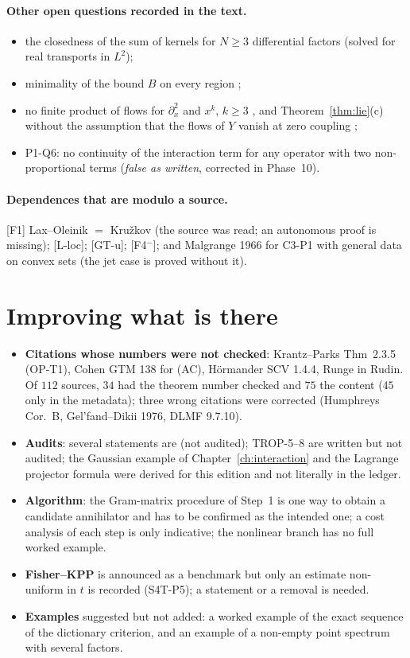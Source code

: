 \paragraph{Other open questions recorded in the text.}
\begin{itemize}
\item the closedness of the sum of kernels for $N\ge3$ differential factors \openq{}  (solved for real transports in $L^2$);
\item minimality of the bound $B$ on every region \openq{} ;
\item no finite product of flows for $\partial_x^2$ and $x^k$, $k\ge3$ \openq{} , and Theorem~\ref{thm:lie}(c) without the assumption that the flows of $Y$ vanish at zero coupling \openq{} ;
\item P1-Q6: no continuity of the interaction term for any operator with two non-proportional terms \openq{} (\emph{false as written}, corrected in Phase~10).
\end{itemize}

\paragraph{Dependences that are modulo a source.} [F1] Lax--Oleinik $=$ Kru\v zkov (the source was read; an autonomous proof is missing); [L-loc]; [GT-u]; [F4$^-$]; and Malgrange 1966 for C3-P1 with general data on convex sets (the jet case is proved without it).

\section{Improving what is there}

\begin{itemize}
\item \textbf{Citations whose numbers were not checked}: Krantz--Parks Thm~2.3.5 (OP-T1), Cohen GTM 138 for (AC), H\"ormander SCV 1.4.4, Runge in Rudin. Of $112$ sources, $34$ had the theorem number checked and $75$ the content ($45$ only in the metadata); three wrong citations were corrected (Humphreys Cor.~B, Gel'fand--Dikii 1976, DLMF 9.7.10).
\item \textbf{Audits}: several statements are \pw{} (not audited); TROP-5--8 are written but not audited; the Gaussian example of Chapter~\ref{ch:interaction} and the Lagrange projector formula were derived for this edition and not literally in the ledger.
\item \textbf{Algorithm}: the Gram-matrix procedure of Step~1 is one way to obtain a candidate annihilator and has to be confirmed as the intended one; a cost analysis of each step is only indicative; the nonlinear branch has no full worked example.
\item \textbf{Fisher--KPP} is announced as a benchmark but only an estimate non-uniform in $t$ is recorded (S4T-P5); a statement or a removal is needed.
\item \textbf{Examples} suggested but not added: a worked example of the exact sequence of the dictionary criterion, and an example of a non-empty point spectrum with several factors.
\end{itemize}

